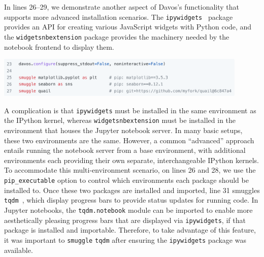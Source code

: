 \documentclass[preprint,12pt,a4paper]{elsarticle}
\begin{document}
In lines 26--29, we demonstrate another aspect of Davos's
functionality that supports more advanced installation scenarios.  The
\texttt{ipywidgets}~\cite{FredEtal15} package provides an API for
creating various JavaScript widgets with Python code, and the \texttt{widgetsnbextension} package provides
the machinery needed by the notebook frontend to display them.
\begin{center}
\includegraphics[width=0.9\textwidth]{figs/example6}
\end{center}
A complication is that \texttt{ipywidgets} must be installed in the
same environment as the IPython kernel, whereas
\texttt{widgetsnbextension} must be installed in the environment that
houses the Jupyter notebook server. In many basic setups, these two
environments are the same.  However, a common ``advanced'' approach
entails running the notebook server from a base environment, with
additional environments each providing their own separate,
interchangeable IPython kernels.  To accommodate this multi-environment
scenario, on lines 26 and 28, we use the \texttt{pip\_executable} option to control which environments each
package should be installed to.  Once these two packages are installed
and imported, line 31 smuggles \texttt{tqdm}~\cite{daCoEtal22}, which
display progress bars to provide status updates for running code. In
Jupyter notebooks, the \texttt{tqdm.notebook} module can be imported
to enable more aesthetically pleasing progress bars that are displayed via
\texttt{ipywidgets}, if that package is installed and
importable. Therefore, to take advantage of this feature, it was
important to \texttt{smuggle} \texttt{tqdm} after ensuring the
\texttt{ipywidgets} package was available.
\end{document}
